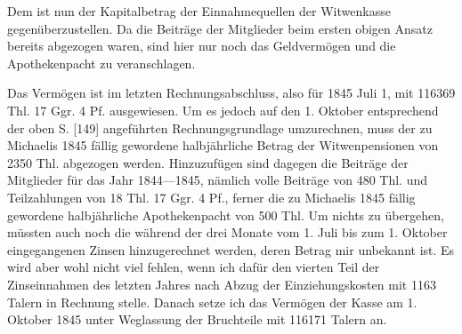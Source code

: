 \noindent\hspace*{\parindent}Dem ist nun der Kapitalbetrag der Einnahmequellen der Witwenkasse gegenüberzustellen. Da die Beiträge der Mitglieder beim ersten obigen Ansatz bereits abgezogen waren, sind hier nur noch das Geldvermögen und die Apothekenpacht zu veranschlagen.

Das Vermögen ist im letzten Rechnungsabschluss, also für 1845 Juli 1, mit 116369 Thl. 17 Ggr. 4 Pf. ausgewiesen. Um es jedoch auf den 1. Oktober entsprechend der oben S. [149] angeführten Rechnungsgrundlage umzurechnen, muss der zu Michaelis 1845 fällig gewordene halbjährliche Betrag der Witwenpensionen von 2350 Thl. abgezogen werden. Hinzuzufügen sind dagegen die Beiträge der Mitglieder für das Jahr 1844—1845, nämlich volle Beiträge von 480 Thl. und Teilzahlungen von 18 Thl. 17 Ggr. 4 Pf., ferner die zu Michaelis 1845 fällig gewordene halbjährliche Apothekenpacht von 500 Thl. Um nichts zu übergehen, müssten auch noch die während der drei Monate vom 1. Juli bis zum 1. Oktober eingegangenen Zinsen hinzugerechnet werden, deren Betrag mir unbekannt ist. Es wird aber wohl nicht viel fehlen, wenn ich dafür den vierten Teil der Zinseinnahmen des letzten Jahres nach Abzug der Einziehungskosten mit 1163 Talern in Rechnung stelle. Danach setze ich das Vermögen der Kasse am 1. Oktober 1845 unter Weglassung der Bruchteile mit 116171 Talern an.

